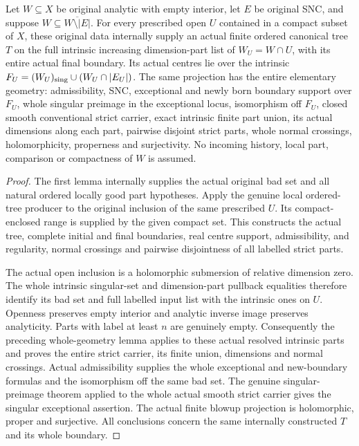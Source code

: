 \begin{theorem}
\label{hir:original-local-nonpure-canonical-target}
\leanok
Let $W\subseteq X$ be original analytic with empty interior, let $E$
be original SNC, and suppose $W\subseteq\overline{W\setminus|E|}$.
For every prescribed open $U$ contained in a compact subset of $X$,
these original data internally supply an actual finite ordered
canonical tree $T$ on the full intrinsic increasing dimension-part
list of $W_U=W\cap U$, with its entire actual final boundary. Its
actual centres lie over the intrinsic
$F_U=(W_U)_{\rm sing}\cup(W_U\cap|E_U|)$.
The same projection has the entire elementary geometry: admissibility,
SNC, exceptional and newly born boundary support over $F_U$, whole
singular preimage in the exceptional locus, isomorphism off $F_U$,
closed smooth conventional strict carrier, exact intrinsic finite
part union, its actual dimensions along each part, pairwise disjoint
strict parts, whole normal crossings, holomorphicity, properness
and surjectivity. No incoming history, local part, comparison or
compactness of $W$ is assumed.
\end{theorem}
\begin{proof}
The first lemma internally supplies the actual original bad set and
all natural ordered locally good part hypotheses. Apply the genuine
local ordered-tree producer to the original inclusion of the same
prescribed $U$. Its compact-enclosed range is supplied by the given
compact set. This constructs the actual tree, complete initial and
final boundaries, real centre support, admissibility, and regularity,
normal crossings and pairwise disjointness of all labelled strict parts.

The actual open inclusion is a holomorphic submersion of relative
dimension zero. The whole intrinsic singular-set and dimension-part
pullback equalities therefore identify its bad set and full labelled
input list with the intrinsic ones on $U$. Openness preserves empty
interior and analytic inverse image preserves analyticity. Parts with
label at least $n$ are genuinely empty. Consequently the preceding
whole-geometry lemma applies to these actual resolved intrinsic parts
and proves the entire strict carrier, its finite union, dimensions and
normal crossings. Actual admissibility supplies the whole exceptional
and new-boundary formulas and the isomorphism off the same bad set.
The genuine singular-preimage theorem applied to the whole actual
smooth strict carrier gives the singular exceptional assertion.
The actual finite blowup projection is holomorphic, proper and
surjective. All conclusions concern the same internally constructed
$T$ and its whole boundary.
\end{proof}

